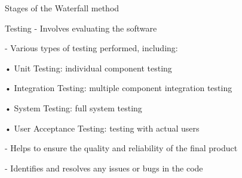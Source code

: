 \begin{frame}{Stages of the Waterfall method}
    \begin{block}{Testing}
        - Involves evaluating the software 
        
        - Various types of testing performed, including:
            
            \hspace*{10mm}• Unit Testing: individual component testing
            
            \hspace*{10mm}• Integration Testing: multiple component integration testing
            
            \hspace*{10mm}• System Testing: full system testing
            
            \hspace*{10mm}• User Acceptance Testing: testing with actual users
        
        - Helps to ensure the quality and reliability of the final product
        
        - Identifies and resolves any issues or bugs in the code
        
    \end{block}   

\end{frame}